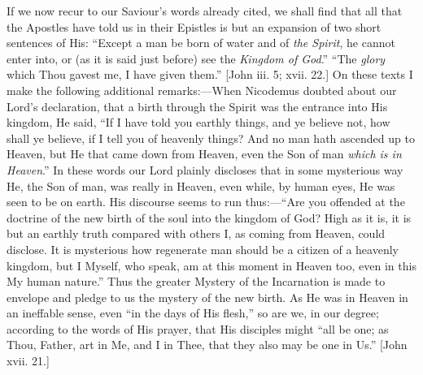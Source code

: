 If we now recur to our Saviour's words already cited, we shall
find that all that the Apostles have told us in their Epistles is but
an expansion of two short sentences of His: ``Except a man be born
of water and of \emph{the Spirit}, he cannot enter into, or (as it is
said just before) see the \emph{Kingdom of God}.'' ``The \emph{glory}
which Thou gavest me, I have given them.'' [John iii. 5; xvii.
22.] On these texts I make the following additional remarks:—When
Nicodemus doubted about our Lord's declaration, that a birth through
the Spirit was the entrance into His kingdom, He said, ``If I have
told you earthly things, and ye believe not, how shall ye believe, if
I tell you of heavenly things? And no man hath ascended up to Heaven,
but He that came down from Heaven, even the Son of man \emph{which is in
Heaven}.'' In these words our Lord plainly discloses that in
some mysterious way He, the Son of man, was really in Heaven, even
while, by human eyes, He was seen to be on earth. His discourse seems
to run thus:—``Are you offended at the doctrine of the new birth
of the soul into the kingdom of God? High as it is, it is but an
earthly truth compared with others I, as coming from Heaven, could
disclose. It is mysterious how regenerate man should be a citizen of a
heavenly kingdom, but I Myself, who speak, am at this moment in Heaven
too, even in this My human nature.'' Thus the greater Mystery of
the Incarnation is made to envelope and pledge to us the mystery of
the new birth. As He was in Heaven in an ineffable sense, even
``in the days of His flesh,'' so are we, in our degree;
according to the words of His prayer, that His disciples might
``all be one; as Thou, Father, art in Me, and I in Thee, that they
also may be one in Us.'' [John xvii. 21.]

